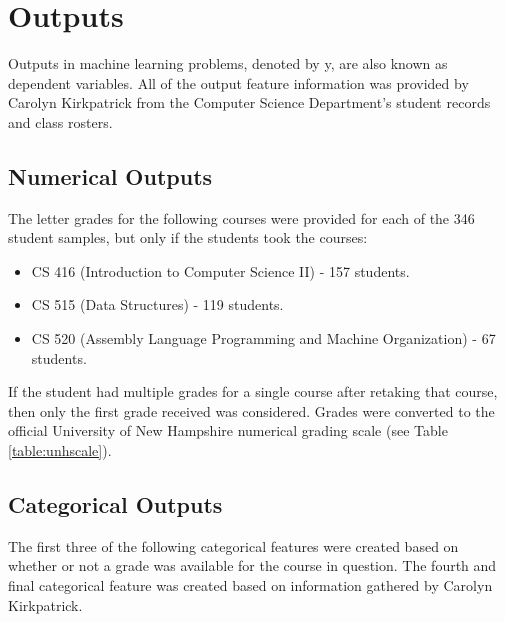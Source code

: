 \documentclass[letterpaper,11pt]{article}
\begin{document}
\section{Outputs}

Outputs in machine learning problems, denoted by y, are also known as dependent variables.  All of the output feature information was provided by Carolyn Kirkpatrick from the Computer Science Department's student records and class rosters.

\subsection{Numerical Outputs}

The letter grades for the following courses were provided for each of the 346 student samples, but only if the students took the courses:

\begin{itemize}
\item CS 416 (Introduction to Computer Science II) - 157 students.
\item CS 515 (Data Structures) - 119 students.
\item CS 520 (Assembly Language Programming and Machine Organization) - 67 students.
\end{itemize}

If the student had multiple grades for a single course after retaking that course, then only the first grade received was considered.  Grades were converted to the official University of New Hampshire numerical grading scale (see Table \ref{table:unhscale}).

\subsection{Categorical Outputs}

The first three of the following categorical features were created based on whether or not a grade was available for the course in question.  The fourth and final categorical feature was created based on information gathered by Carolyn Kirkpatrick.  
\end{document}
